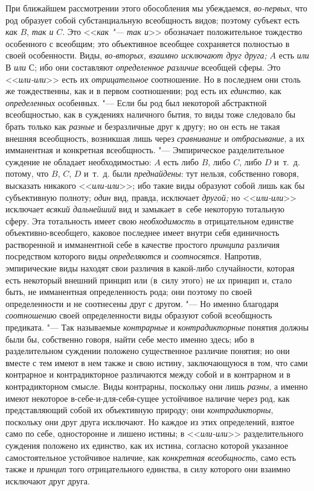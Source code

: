 При ближайшем рассмотрении этого обособления мы убеждаемся,
{\em во-первых}, что род
образует собой субстанциальную всеобщность видов; поэтому субъект есть
{\em как} $B$, {\em так и} $C$. Это <<{\em как "--- так и}>>
обозначает положительное тождество особенного с всеобщим; это
объективное всеобщее сохраняется полностью в своей особенности. Виды,
{\em во-вторых, взаимно исключают друг друга;} $A$ есть
{\em или} $В$ {\em или} $С$; ибо они составляют {\em определенное
различие} всеобщей сферы. Это <<{\em или-или}>> есть их {\em отрицательное}
соотношение. Но в последнем они столь же тождественны, как и
в первом соотношении; род есть их {\em единство}, как {\em определенных}
особенных. "--- Если бы род был некоторой
абстрактной всеобщностью, как в суждениях наличного бытия, то виды тоже
следовало бы брать только как {\em разные} и
безразличные друг к другу; но он есть не такая внешняя всеобщность,
возникшая лишь через {\em сравнивание} и {\em отбрасывание},
а их имманентная и конкретная всеобщность. "---
Эмпирическое разделительное суждение не обладает
необходимостью: $A$ есть либо $B$, либо $C$, либо $D$ и~т.~д.
потому, что $B$, $C$, $D$ и~т.~д. были {\em преднайдены}: тут
нельзя, собственно говоря, высказать никакого <<{\em или-или}>>; ибо
такие виды образуют собой лишь как бы субъективную полноту;
{\em один} вид, правда, исключает {\em другой;} но <<{\em или-или}>>
исключает {\em всякий дальнейший} вид и замыкает в~себе некоторую
тотальную сферу. Эта тотальность имеет свою {\em необходимость} в
отрицательном единстве объективно-всеобщего, каковое последнее имеет внутри
себя единичность растворенной и имманентной себе в качестве простого
{\em принципа} различия посредством которого виды {\em определяются} и
{\em соотносятся}. Напротив, эмпирические виды находят свои различия в
какой-либо случайности, которая есть некоторый внешний принцип или (в~силу
этого) не {\em их} принцип и, стало быть, не имманентная определенность рода;
они поэтому по своей определенности и не соотнесены друг с другом. "---
Но именно благодаря {\em соотношению} своей
определенности виды образуют собой всеобщность предиката. "--- Так называемые
{\em контрарные} и {\em контрадикторные}
понятия должны были бы, собственно говоря, найти себе место
именно здесь; ибо в разделительном суждении положено существенное различие
понятия; но они вместе с тем имеют в нем также и свою истину, заключающуюся
в том, что сами контрарное и контрадикторное различаются между собой и в
контрарном и в контрадикторном смысле. Виды контрарны, поскольку они лишь
{\em разны}, а именно
имеют некоторое в-себе-и-для-себя-сущее устойчивое наличие через род, как
представляющий собой их объективную природу; они {\em контрадикторны},
поскольку они друг друга исключают. Но каждое из этих
определений, взятое само по себе, односторонне и лишено истины; в
<<{\em или-или}>>
разделительного суждения положено их единство, как их истина,
согласно которой указанное самостоятельное устойчивое наличие, как
{\em конкретная всеобщность}, само есть также и {\em принцип} того
отрицательного единства, в силу которого они взаимно исключают друг друга.

